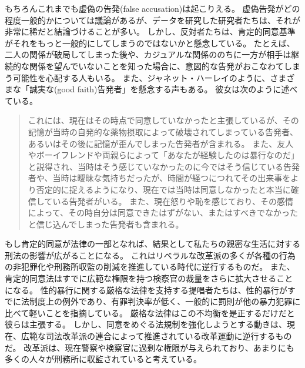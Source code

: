 \documentclass[paper=a4,book,openany]{jlreq}
\begin{document}
もちろんこれまでも虚偽の告発(false accusation)は起こりえる。
虚偽告発がどの程度一般的かについては議論があるが、データを研究した研究者たちは、それが非常に稀だと結論づけることが多い\citep{ferguson16:_asses_polic_class_sexual_assaul_repor}。
しかし、反対者たちは、肯定的同意基準がそれをもっと一般的にしてしまうのではないかと懸念している。
たとえば、二人の関係が破局してしまった後や、カジュアルな関係ののちに一方が相手は継続的な関係を望んでいないことを知った場合に、意図的な告発がおこなわてしまう可能性を心配する人もいる。
また、ジャネット・ハーレイのように、さまざまな「誠実な(good faith)告発者」を懸念する声もある。
彼女は次のように述べている。

\begin{quote}
これには、現在はその時点で同意していなかったと主張しているが、その記憶が当時の自発的な薬物摂取によって破壊されてしまっている告発者、あるいはその後に記憶が歪んでしまった告発者が含まれる。
また、友人やボーイフレンドや両親らによって「あなたが経験したのは暴行なのだ」と説得され、当時はそう感じていなかったのに今ではそう信じている告発者や、当時は曖昧な気持ちだったが、時間が経つにつれてその出来事をより否定的に捉えるようになり、現在では当時は同意しなかったと本当に確信している告発者がいる。
また、現在怒りや恥を感じており、その感情によって、その時自分は同意できたはずがない、またはすべきでなかったと信じ込んでしまった告発者も含まれる。
\citep[p.272]{halley16:_move_affir_consen}
\end{quote}

もし肯定的同意が法律の一部となれば、結果として私たちの親密な生活に対する刑法の影響が広がることになる。
これはリベラルな改革派の多くが各種の行為の非犯罪化や刑務所収監の削減を推進している時代に逆行するものだ。
また、肯定的同意法はすでに広範な権限を持つ検察官の裁量をさらに拡大させることになる。
性的暴行に関する厳格な法律を支持する提唱者たちは、性的暴行がすでに法制度上の例外であり、有罪判決率が低く、一般的に罰則が他の暴力犯罪に比べて軽いことを指摘している。
厳格な法律はこの不均衡を是正するだけだと彼らは主張する。
しかし、同意をめぐる法規制を強化しようとする動きは、現在、広範な司法改革派の連合によって推進されている改革運動に逆行するものだ。
改革派は、現在警察や検察官に過剰な権限が与えられており、あまりにも多くの人々が刑務所に収監されていると考えている。
\end{document}
